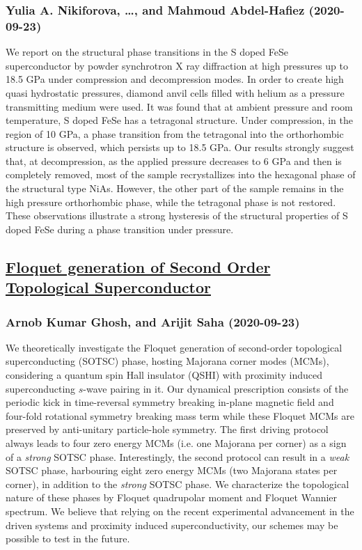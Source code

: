 \subsubsection*{Yulia A. Nikiforova, \dots, and Mahmoud Abdel-Hafiez (2020-09-23)}
We report on the structural phase transitions in the S doped FeSe
superconductor by powder synchrotron X ray diffraction at high pressures up to
18.5 GPa under compression and decompression modes. In order to create high
quasi hydrostatic pressures, diamond anvil cells filled with helium as a
pressure transmitting medium were used. It was found that at ambient pressure
and room temperature, S doped FeSe has a tetragonal structure. Under
compression, in the region of 10 GPa, a phase transition from the tetragonal
into the orthorhombic structure is observed, which persists up to 18.5 GPa. Our
results strongly suggest that, at decompression, as the applied pressure
decreases to 6 GPa and then is completely removed, most of the sample
recrystallizes into the hexagonal phase of the structural type NiAs. However,
the other part of the sample remains in the high pressure orthorhombic phase,
while the tetragonal phase is not restored. These observations illustrate a
strong hysteresis of the structural properties of S doped FeSe during a phase
transition under pressure.

\subsection*{\href{http://arxiv.org/abs/2009.11220v1}{Floquet generation of Second Order Topological Superconductor}}
\subsubsection*{Arnob Kumar Ghosh, and Arijit Saha (2020-09-23)}
We theoretically investigate the Floquet generation of second-order
topological superconducting (SOTSC) phase, hosting Majorana corner modes
(MCMs), considering a quantum spin Hall insulator (QSHI) with proximity induced
superconducting $s$-wave pairing in it. Our dynamical prescription consists of
the periodic kick in time-reversal symmetry breaking in-plane magnetic field
and four-fold rotational symmetry breaking mass term while these Floquet MCMs
are preserved by anti-unitary particle-hole symmetry. The first driving
protocol always leads to four zero energy MCMs (i.e. one Majorana per corner)
as a sign of a {\it{strong}} SOTSC phase. Interestingly, the second protocol
can result in a {\it{weak}} SOTSC phase, harbouring eight zero energy MCMs (two
Majorana states per corner), in addition to the {\it{strong}} SOTSC phase. We
characterize the topological nature of these phases by Floquet quadrupolar
moment and Floquet Wannier spectrum. We believe that relying on the recent
experimental advancement in the driven systems and proximity induced
superconductivity, our schemes may be possible to test in the future.

